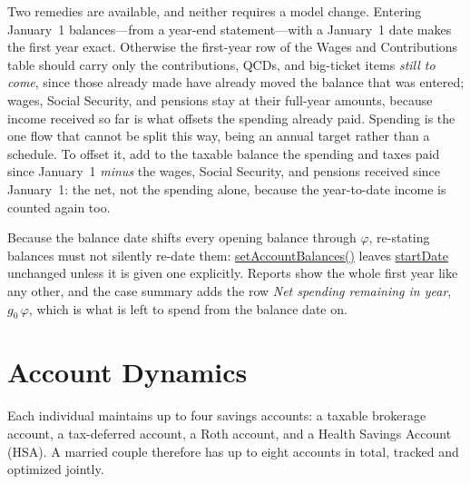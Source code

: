 \documentclass[fleqn,12pt]{report}
\newcommand{\code}[1]{\url{#1}}
\begin{document}
Two remedies are available, and neither requires a model change.
Entering January~1 balances---from a year-end statement---with a January~1 date
makes the first year exact.
Otherwise the first-year row of the Wages and Contributions table should carry
only the contributions, QCDs, and big-ticket items \emph{still to come}, since
those already made have already moved the balance that was entered; wages,
Social Security, and pensions stay at their full-year amounts, because
income received so far is what offsets the spending already paid.
Spending is the one flow that cannot be split this way, being an annual target
rather than a schedule.
To offset it, add to the taxable balance the spending and taxes paid since
January~1 \emph{minus} the wages, Social Security, and pensions received since
January~1: the net, not the spending alone, because the year-to-date income is
counted again too.

Because the balance date shifts every opening balance through $\varphi$,
re-stating balances must not silently re-date them: \code{setAccountBalances()}
leaves \code{startDate} unchanged unless it is given one explicitly.
Reports show the whole first year like any other, and the case summary adds the
row \textit{Net spending remaining in year}, $g_0\,\varphi$, which is what is
left to spend from the balance date on.

\section{Account Dynamics}

Each individual maintains up to four savings accounts: a taxable brokerage
account, a tax-deferred account, a Roth account, and a Health Savings Account (HSA).
A married couple therefore has up to eight accounts in total, tracked and
optimized jointly.
\end{document}

